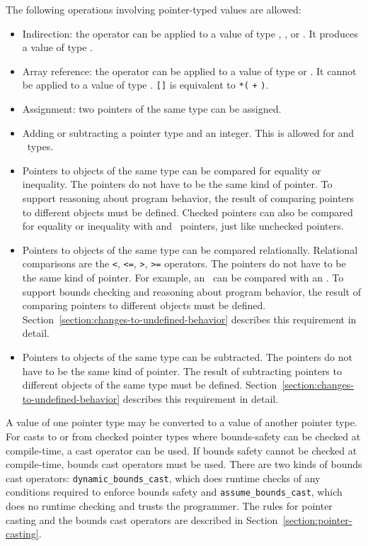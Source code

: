 The following operations involving pointer-typed values are allowed:

\begin{itemize}
\item
  Indirection: the \code{*} operator can be applied to a value of type
   \code{*}, \ptrT, or \arrayptrT. It produces a value of type .
\item
  Array reference: the \code{[]} operator can be applied to a
  value of type  \code{*} or \arrayptrT. It
  cannot be applied to a value of type \ptrT.
  \lstinline|[|\lstinline|]| is equivalent to
  \lstinline|*(| \lstinline|+| \lstinline|)|.
\item
  Assignment: two pointers of the same type can be assigned.
\item
  Adding or subtracting a pointer type and an integer. This is allowed
  for  \code{*} and \arrayptrT\ types.
\item
  Pointers to objects of the same type can be compared for equality or
  inequality. The pointers do not have to be the same kind of pointer.
  To support reasoning about program behavior, the result of comparing
  pointers to different objects must be defined.  Checked pointers can also
  be compared for equality or inequality with  and \void\ pointers, 
  just like unchecked pointers.
\item
  Pointers to objects of the same type can be compared relationally. Relational comparisons are the
  \lstinline|<|, \lstinline|<=|, \lstinline|>|, \lstinline|>=| operators. The pointers do not have 
  to be
  the same kind of pointer. For example, an \uncheckedptrT\ can be compared with an
  \arrayptrT . To support bounds checking and reasoning about program behavior, the
  result of comparing pointers to different objects must be defined.
  Section~\ref{section:changes-to-undefined-behavior} describes this requirement in detail.
\item
  Pointers to objects of the same type can be subtracted. The pointers do not have to be
  the same kind of
  pointer. The result of subtracting pointers to different objects of
  the same type must be defined. Section~\ref{section:changes-to-undefined-behavior}
  describes this requirement in detail.
\end{itemize}

A value of one pointer type may be converted to a value of another
pointer type. For casts to or from checked pointer types where
bounds-safety can be checked at compile-time, a cast operator can be
used. If bounds safety cannot be checked at compile-time, bounds cast
operators must be used. There are two kinds of bounds cast operators:
\lstinline+dynamic_bounds_cast+, which does runtime checks of any
conditions required to enforce bounds safety and
\lstinline+assume_bounds_cast+, which does no runtime checking and
trusts the programmer. The rules for pointer casting and the bounds cast
operators are described in Section~\ref{section:pointer-casting}.

